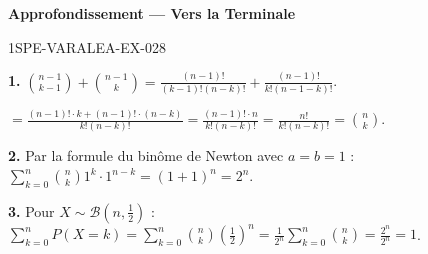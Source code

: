 \begin{center}\textbf{Approfondissement — Vers la Terminale}\end{center}
\begin{corrige}{1SPE-VARALEA-EX-028}

\textbf{1.} $\binom{n-1}{k-1} + \binom{n-1}{k} = \frac{(n-1)!}{(k-1)!(n-k)!} + \frac{(n-1)!}{k!(n-1-k)!}$.

$= \frac{(n-1)! \cdot k + (n-1)! \cdot (n-k)}{k!(n-k)!} = \frac{(n-1)! \cdot n}{k!(n-k)!} = \frac{n!}{k!(n-k)!} = \binom{n}{k}$.

\medskip
\textbf{2.} Par la formule du binôme de Newton avec $a=b=1$ :
$\sum_{k=0}^{n} \binom{n}{k} 1^k \cdot 1^{n-k} = (1+1)^n = 2^n$.

\medskip
\textbf{3.} Pour $X \sim \mathcal{B}(n, \frac{1}{2})$ :
$\sum_{k=0}^{n} P(X=k) = \sum_{k=0}^{n} \binom{n}{k} \left(\frac{1}{2}\right)^n = \frac{1}{2^n} \sum_{k=0}^{n} \binom{n}{k} = \frac{2^n}{2^n} = 1$. \checkmark

\end{corrige}

